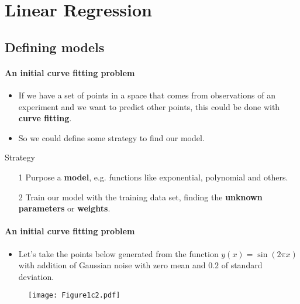 \section{Linear Regression}\label{sec:linear-regression}
\framecard{\insertsection}
\subsection{Defining models}

\begin{frame}{\insertsubsection}
	\framesubtitle{An initial curve fitting problem}

\begin{itemize}
	\item If we have a set of points in a space that comes from observations of an experiment and we want to predict other points, this could be done with \textbf{\textcolor{UniOrange}{curve fitting}}.
	\item So we could define some strategy to find our model.
\end{itemize}

\begin{block}{Strategy}
	\begin{itemize}
		\item[1] Purpose a \textcolor{UniBlue}{\textbf{model}}, e.g. functions like exponential, polynomial and others.
		\item[2] Train our model with the training data set, finding the \textcolor{UniBlue}{\textbf{unknown parameters}} or \textcolor{UniBlue}{\textbf{weights}}.
	\end{itemize}
\end{block}
\end{frame}


\begin{frame}{\insertsubsection}
	\framesubtitle{An initial curve fitting problem}
	\begin{itemize}
		\item Let's take the points below generated from the function $y(x)=\sin (2\pi x)$ with addition of Gaussian noise with zero mean and $0.2$ of standard deviation.
	\end{itemize}

	\begin{figure}
	\label{fig:plot-fitting-example}
		\texttt{[image: Figure1c2.pdf]}
	\end{figure}
\end{frame}

